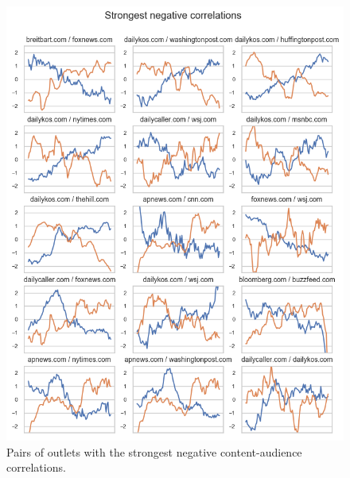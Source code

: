 \documentclass{scrartcl}
\begin{document}
\begin{figure}[H]
  \centering
  \includegraphics[height=0.6\textheight]{figures/ts-ca-neg-corrs.png}
  \caption{Pairs of outlets with the strongest negative content-audience correlations.}
\end{figure}
\end{document}
